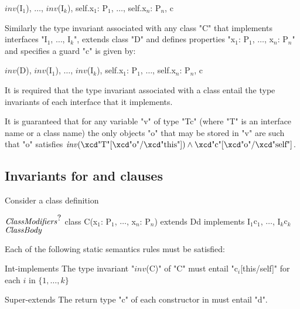 \begin{xtenmath}
$\mathit{inv}$(I$_1$), $\dots$, $\mathit{inv}$(I$_k$),
    self.x$_1$: P$_1$,  $\dots$,  self.x$_n$: P$_n$, c  
\end{xtenmath}

Similarly the type invariant associated with any class \xcd"C" that
implements interfaces \xcdmath"I$_1$, $\dots$, I$_k$",
extends class \xcd"D" and defines properties
\xcdmath"x$_1$: P$_1$, $\dots$, x$_n$: P$_n$" and
specifies a guard \xcd"c" is
given by:
\begin{xtenmath}
$\mathit{inv}$(D), $\mathit{inv}$(I$_1$),  $\dots$, $\mathit{inv}$(I$_k$),
    self.x$_1$: P$_1$,  $\dots$, self.x$_n$: P$_n$,  c  
\end{xtenmath}

It is required that the type invariant associated with a class entail
the type invariants of each interface that it implements.

It is guaranteed that for any variable \xcd"v" of
type \xcd"T{c}" (where \xcd"T" is an interface name or a class name) the only
objects \xcd"o" that may be stored in \xcd"v" are such that \xcd"o" satisfies
$\mathit{inv}(\mbox{\xcd"T"}[\mbox{\xcd"o"}/\mbox{\xcd"this"}])
\wedge \mbox{\xcd"c"}[\mbox{\xcd"o"}/\mbox{\xcd"self"}]$.



\subsection{Invariants for  and  clauses}\label{DepType:Implements}
\label{DepType:Extends}
Consider a class definition
\begin{xtenmath}
$\mbox{\emph{ClassModifiers}}^{\mbox{?}}$
class C(x$_1$: P$_1$, $\dots$, x$_n$: P$_n$) extends D{d}
   implements I$_1${c$_1$}, $\dots$, I$_k${c$_k$}
$\mbox{\emph{ClassBody}}$
\end{xtenmath}

Each of the following static semantics rules must be satisfied:

\begin{staticrule}{Int-implements}
The type invariant \xcdmath"$\mathit{inv}$(C)" of \xcd"C" must entail
\xcdmath"c$_i$[this/self]" for each $i$ in $\{1, \dots, k\}$
\end{staticrule}

\begin{staticrule}{Super-extends}
The return type \xcd"c" of each constructor in 
must entail \xcd"d".
\end{staticrule}

